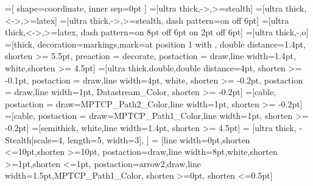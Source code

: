 %
%
=[%
	shape=coordinate,%
	inner sep=0pt%
]%
%
%
%
%
%
%
%
%
%
%
%
%
=[ultra thick,->,>=stealth]%
=[ultra thick,<->,>=latex]%
=[ultra thick,->,>=stealth,
	dash pattern=on \pgflinewidth off 6pt]%
=[ultra thick,<->,>=latex,
	dash pattern=on 8pt off 6pt on 2pt off 6pt]%
=[ultra thick,-,o]%
=[thick, decoration={markings,mark=at position%
   1 with {}},%
   double distance=1.4pt, shorten >= 5.5pt,%
   preaction = {decorate},%
   postaction = {draw,line width=1.4pt, white,shorten >= 4.5pt}]%
%
%
%
%
%
%
=[ultra thick,double,double distance=4pt,%
	shorten >= -0.1pt,%
	postaction = {draw,line width=4pt, white, shorten >= -0.2pt},%
	postaction = {draw,line width=1pt, Datastream_Color, shorten >= -0.2pt}]%
=[cable,%
	postaction = {draw=MPTCP_Path2_Color,line width=1pt, shorten >= -0.2pt}]%
=[cable,%
	postaction = {draw=MPTCP_Path1_Color,line width=1pt, shorten >= -0.2pt}]%
=[semithick, white,line width=1.4pt, shorten >= 4.5pt]%
%
%
 = [ultra thick,%
	-{Stealth[scale=4,%
	length=5,%
	width=3]},%
]%
 = [line width=0pt,shorten <=10pt,shorten >=10pt,%
	postaction={draw,line width=8pt,white,shorten >=1pt,shorten <=1pt},%
	postaction={arrow2,draw,line width=1.5pt,MPTCP_Path1_Color,%
	shorten >=0pt,%
	shorten <=0.5pt}]%
